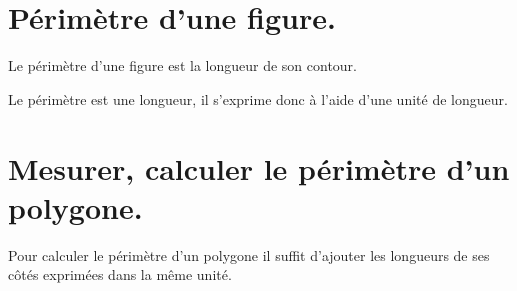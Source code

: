 \begin{pageCours}

\section{Périmètre d'une figure.}

\begin{Def}
Le périmètre d'une figure est la longueur de son contour.
\end{Def}

\begin{Rq}
Le périmètre est une longueur, il s'exprime donc à l'aide d'une unité de longueur.
\end{Rq}

\section{Mesurer, calculer le périmètre d'un polygone.}

\begin{Mt}
Pour calculer le périmètre d'un polygone il suffit d'ajouter les longueurs de ses côtés exprimées dans la même unité.
\end{Mt}



\end{pageCours}
